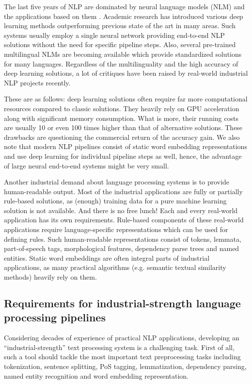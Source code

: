\documentclass{llncs}
\begin{document}
The last five years of NLP are dominated by neural language models (NLM) and the applications based on them \citep{nlp-trends}. Academic research has introduced various deep learning methods outperforming previous state of the art in many areas. Such systems usually employ a single neural network providing end-to-end NLP solutions without the need for specific pipeline steps. Also, several pre-trained multilingual NLMs are becoming available which provide standardized solutions for many languages. Regardless of the multilinguality and the high accuracy of deep learning solutions, a lot of critiques have been raised by real-world industrial NLP projects recently.

These are as follows: deep learning solutions often require far more computational resources compared to classic solutions. They heavily rely on GPU acceleration along with significant memory consumption. What is more, their running costs are usually 10 or even 100 times higher than that of alternative solutions. These drawbacks are questioning the commercial return of the accuracy gain. We also note that modern NLP pipelines consist of static word embedding representations and use deep learning for individual pipeline steps as well, hence, the advantage of large neural end-to-end systems might be very small.

Another industrial demand about language processing systems is to provide human-readable output. Most of the industrial applications are fully or partially rule-based solutions, as (enough) training data for a pure machine learning solution is not available. And there is no free lunch! Each and every real-world application has its own requirements. Rule-based components of these real-world applications require language-specific representations which can be used for defining rules. Such human-readable representations consist of tokens, lemmata, part-of-speech tags, morphological features, dependency parse trees and named entities. Static word embeddings are often integral parts of industrial applications, as many practical algorithms (e.g. semantic textual similarity methods) heavily rely on them.

\subsection{Requirements for industrial-strength language processing pipelines}

Considering decades of experience of practical NLP applications, developing an “industrial-strength” text processing system is a challenging task. First of all, such a tool should tackle the most important text preprocessing tasks including tokenization, sentence splitting, PoS tagging, lemmatization, dependency parsing, named entity recognition and word embedding representation. 
\end{document}
